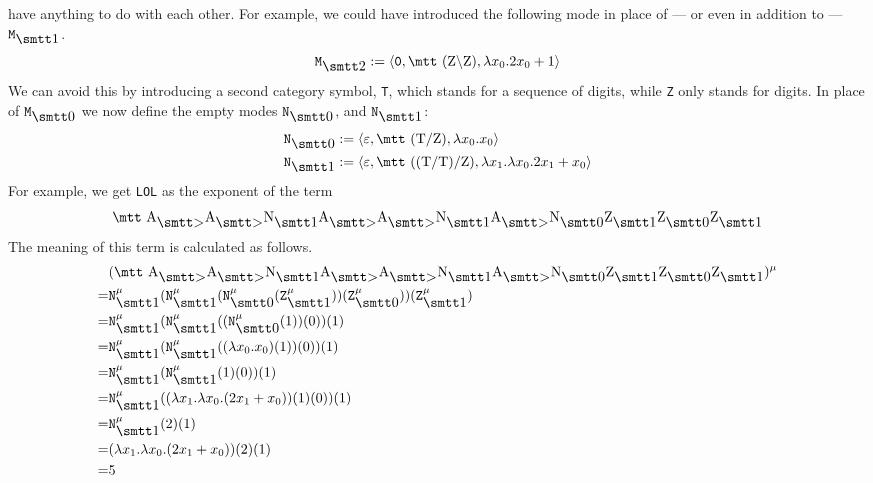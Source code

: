 have anything to do with each other. For example, we could have
introduced the following mode in place of --- or even in addition 
to --- $\mbox{\tt M}_{\seins}$.
\begin{equation}
\mbox{\tt M}_{\szwei} := \auf \mbox{\tt 0}, \mbox{\mtt (Z{\tb}Z)},
    \lambda x_0.2x_0+1\zu
\end{equation} 
We can avoid this by introducing a second category symbol,
{\tt T}, which stands for a sequence of digits, while
{\tt Z} only stands for digits. In place of $\mbox{\tt M}_{\snull}$
we now define the empty modes $\mbox{\tt N}_{\snull}$,
and $\mbox{\tt N}_{\seins}$:
\begin{align}
\mbox{\tt N}_{\snull} & := \auf \varepsilon, \mbox{\mtt (T{\tf}Z)},
    \lambda x_0.x_0\zu \\
\mbox{\tt N}_{\seins} & := \auf \varepsilon, \mbox{\mtt ((T{\tf}T){\tf}Z)},
    \lambda x_1.\lambda x_0.2x_1+x_0\zu
\end{align}
For example, we get {\tt LOL} as the exponent of the term
\begin{equation}
\mbox{\mtt A$_{\sgr}$A$_{\sgr}$N$_{\seins}$A$_{\sgr}$A$_{\sgr}$N%
$_{\seins}$A$_{\sgr}$N$_{\snull}$Z$_{\seins}$Z$_{\snull}$Z$_{\seins}$} 
\end{equation}
The meaning of this term is calculated as follows.
\begin{align}
\begin{split}
& (\mbox{\mtt A$_{\sgr}$A$_{\sgr}$N$_{\seins}$A$_{\sgr}$A$_{\sgr}$N%
$_{\seins}$A$_{\sgr}$N$_{\snull}$Z$_{\seins}$Z$_{\snull}$Z$_{\seins}$}%
)^{\mu} \\
	= & \mbox{\tt N}_{\seins}^{\mu}(\mbox{\tt N}_{\seins}^{\mu}(%
    \mbox{\tt N}_{\snull}^{\mu}(\mbox{\tt Z}_{\seins}^{\mu})) %
	(\mbox{\tt Z}_{\snull}^{\mu}))(\mbox{\tt Z}_{\seins}^{\mu}) \\
    = &
    \mbox{\tt N}_{\seins}^{\mu}(\mbox{\tt N}_{\seins}^{\mu}((%
    \mbox{\tt N}_{\snull}^{\mu}(1)) (0))(1) \\
    = & \mbox{\tt N}_{\seins}^{\mu}(\mbox{\tt N}_{\seins}^{\mu}(%
    (\lambda x_0.x_0)(1))(0))(1) \\
    = & \mbox{\tt N}_{\seins}^{\mu}(\mbox{\tt N}_{\seins}^{\mu}(1)(0))(1) \\
    = & \mbox{\tt N}_{\seins}^{\mu}((\lambda x_1.\lambda x_0.(2x_1+x_0
    ))(1)(0))(1) \\
    = & \mbox{\tt N}_{\seins}^{\mu}(2)(1) \\
    = & (\lambda x_1.\lambda x_0.(2x_1+x_0))(2)(1) \\
    = & 5
\end{split}
\end{align}
